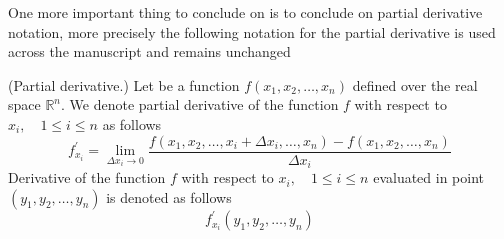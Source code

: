 One more important thing to conclude on is to conclude on partial derivative notation,
more precisely the following notation for the partial derivative is used across the manuscript and remains unchanged
\begin{notation} (Partial derivative.) Let be a function $f(x_1, x_2, \dots, x_n)$ defined over the real space $\mathbb{R}^n$.
We denote partial derivative of the function $f$ with respect to $x_i, \quad 1 \leq i \leq n$ as follows
    \begin{equation*}
        f^{'}_{x_i} = \lim_{\Delta x_i \to 0} \frac{f(x_1, x_2, \dots, x_i + \Delta x_i, \dots, x_n) - f(x_1, x_2, \dots, x_n)}{\Delta x_i}
    \end{equation*}
Derivative of the function $f$ with respect to $x_i, \quad 1 \leq i \leq n$ evaluated in point $(y_1, y_2, \dots, y_n)$ is denoted as follows
    \begin{equation*}
        f^{'}_{x_i} (y_1, y_2, \dots, y_n)
    \end{equation*}
\end{notation}


